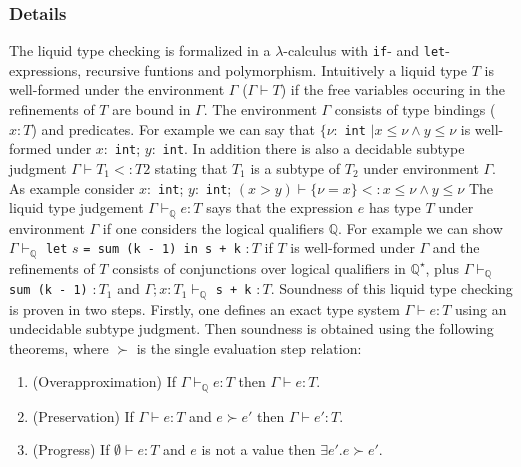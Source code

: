 \documentclass[a4paper,UKenglish]{lipics-v2016}
\begin{document}

\subsubsection{Details}

The liquid type checking is formalized in a $\lambda$-calculus with \lstinline{if}- and \lstinline{let}-expressions, recursive funtions and polymorphism.
Intuitively a liquid type $T$ is well-formed under the environment $\Gamma$ ($\Gamma \vdash T$) if the free variables occuring in the refinements of $T$ are bound in $\Gamma$.
The environment $\Gamma$ consists of type bindings ($x: T$) and predicates.
For example we can say that $\{\nu:$ \lstinline{int} $\mid x \le \nu \land y \le \nu$ is well-formed under $x:$ \lstinline{int}; $y:$ \lstinline{int}.
In addition there is also a decidable subtype judgment $\Gamma \vdash T_1 <: T2$ stating that $T_1$ is a subtype of $T_2$ under environment $\Gamma$.
As example consider $x:$ \lstinline{int}; $y:$ \lstinline{int}; $(x > y) \vdash \{\nu = x \} <: x \le \nu \land y \le \nu$
The liquid type judgement $\Gamma \vdash_{\mathbb{Q}} e: T$ says that the expression $e$ has type $T$ under environment $\Gamma$ if one considers the logical qualifiers $\mathbb{Q}$.
For example we can show $\Gamma \vdash_{\mathbb{Q}}$ \lstinline{let} $s$ \lstinline{= sum (k - 1) in s + k} $: T$ if $T$ is well-formed under $\Gamma$ and the refinements of $T$ consists of conjunctions over logical qualifiers in $\mathbb{Q}^\star$, plus
$\Gamma \vdash_{\mathbb{Q}}$ \lstinline{sum (k - 1)} $:T_1$ and $\Gamma; x: T_1 \vdash_{\mathbb{Q}}$ \lstinline{s + k} $: T$.
Soundness of this liquid type checking is proven in two steps.
Firstly, one defines an exact type system $\Gamma \vdash e: T$ using an undecidable subtype judgment.
Then soundness is obtained using the following theorems, where $\succ$ is the single evaluation step relation:
\begin{enumerate}
    \label{thm:sound}
    \item (Overapproximation) If $\Gamma \vdash_{\mathbb{Q}} e: T$ then $\Gamma \vdash e: T$.
    \item (Preservation) If $\Gamma \vdash e: T$ and $e \succ e'$ then $\Gamma \vdash e': T$.
    \item (Progress) If $\emptyset \vdash e: T$ and $e$ is not a value then $\exists e'. e \succ e'$.
\end{enumerate}
\end{document}
